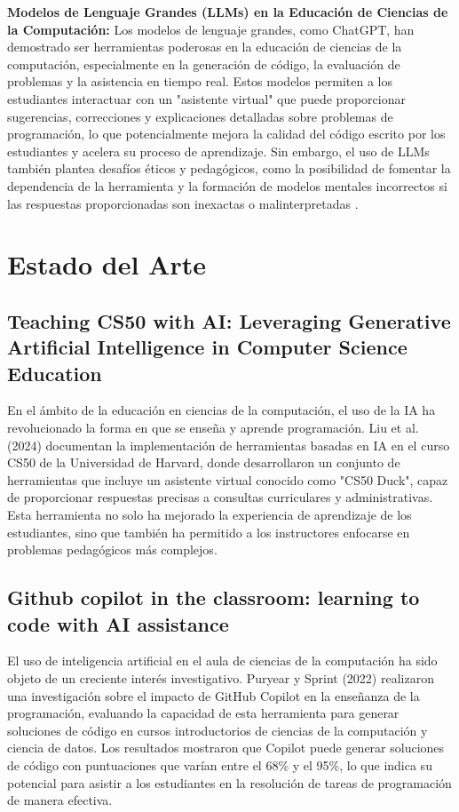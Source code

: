 \documentclass[a4paper,10pt]{article}
\begin{document}
\textbf{Modelos de Lenguaje Grandes (LLMs) en la Educación de Ciencias de la Computación:} Los modelos de lenguaje grandes, como ChatGPT, han demostrado ser herramientas poderosas en la educación de ciencias de la computación, especialmente en la generación de código, la evaluación de problemas y la asistencia en tiempo real. Estos modelos permiten a los estudiantes interactuar con un "asistente virtual" que puede proporcionar sugerencias, correcciones y explicaciones detalladas sobre problemas de programación, lo que potencialmente mejora la calidad del código escrito por los estudiantes y acelera su proceso de aprendizaje. Sin embargo, el uso de LLMs también plantea desafíos éticos y pedagógicos, como la posibilidad de fomentar la dependencia de la herramienta y la formación de modelos mentales incorrectos si las respuestas proporcionadas son inexactas o malinterpretadas \cite{Wang2023ExploringTR}.

\section{Estado del Arte}

\subsection*{Teaching CS50 with AI: Leveraging Generative Artificial Intelligence in Computer Science Education}

En el ámbito de la educación en ciencias de la computación, el uso de la IA ha revolucionado la forma en que se enseña y aprende programación. Liu et al. (2024) \cite{Liu2024TeachingCW} documentan la implementación de herramientas basadas en IA en el curso CS50 de la Universidad de Harvard, donde desarrollaron un conjunto de herramientas que incluye un asistente virtual conocido como "CS50 Duck", capaz de proporcionar respuestas precisas a consultas curriculares y administrativas. Esta herramienta no solo ha mejorado la experiencia de aprendizaje de los estudiantes, sino que también ha permitido a los instructores enfocarse en problemas pedagógicos más complejos.

\subsection*{Github copilot in the classroom: learning to code with AI assistance}

El uso de inteligencia artificial en el aula de ciencias de la computación ha sido objeto de un creciente interés investigativo. Puryear y Sprint (2022) \cite{puryear2022github} realizaron una investigación sobre el impacto de GitHub Copilot en la enseñanza de la programación, evaluando la capacidad de esta herramienta para generar soluciones de código en cursos introductorios de ciencias de la computación y ciencia de datos. Los resultados mostraron que Copilot puede generar soluciones de código con puntuaciones que varían entre el 68\% y el 95\%, lo que indica su potencial para asistir a los estudiantes en la resolución de tareas de programación de manera efectiva.
\end{document}
